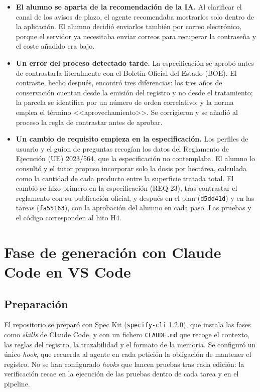 \begin{itemize}
	\item \textbf{El alumno se aparta de la recomendación de la IA.} Al clarificar el canal de los avisos de plazo, el agente recomendaba mostrarlos solo dentro de la aplicación. El alumno decidió enviarlos también por correo electrónico, porque el servidor ya necesitaba enviar correos para recuperar la contraseña y el coste añadido era bajo.
	\item \textbf{Un error del proceso detectado tarde.} La especificación se aprobó antes de contrastarla literalmente con el Boletín Oficial del Estado (BOE). El contraste, hecho después, encontró tres diferencias: los tres años de conservación cuentan desde la emisión del registro y no desde el tratamiento; la parcela se identifica por un número de orden correlativo; y la norma emplea el término <<aprovechamiento>>. Se corrigieron y se añadió al proceso la regla de contrastar antes de aprobar.
	\item \textbf{Un cambio de requisito empieza en la especificación.} Los perfiles de usuario y el guion de preguntas recogían los datos del Reglamento de Ejecución (UE) 2023/564, que la especificación no contemplaba. El alumno lo consultó y el tutor propuso incorporar solo la dosis por hectárea, calculada como la cantidad de cada producto entre la superficie tratada total. El cambio se hizo primero en la especificación (REQ-23), tras contrastar el reglamento con su publicación oficial, y después en el plan (\texttt{d5dd41d}) y en las tareas (\texttt{fa55163}), con la aprobación del alumno en cada paso. Las pruebas y el código corresponden al hito H4. 
\end{itemize}


\section{Fase de generación con Claude Code en VS Code}\label{sec:Generacion}

\subsection{Preparación}\label{subsec:Preparacion}

El repositorio se preparó con Spec Kit (\texttt{specify-cli} 1.2.0), que instala las fases como \emph{skills} de Claude Code, y con un fichero \texttt{CLAUDE.md} que recoge el contexto, las reglas del registro, la trazabilidad y el formato de la memoria. Se configuró un único \emph{hook}, que recuerda al agente en cada petición la obligación de mantener el registro. No se han configurado \emph{hooks} que lancen pruebas tras cada edición: la verificación recae en la ejecución de las pruebas dentro de cada tarea y en el pipeline.

